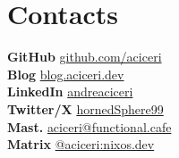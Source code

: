 \documentclass[]{cv}
\begin{document}
\begin{minipage}[t]{0.24\textwidth}
  \sectionsep

  \section{Contacts}
  {\bf GitHub} \textrm{\href{https://github.com/}{github.com/aciceri}} \\
  {\bf Blog} \href{https://blog.aciceri.dev}{blog.aciceri.dev} \\
  {\bf LinkedIn} \href{https://www.linkedin.com/}{andreaciceri} \\
  {\bf Twitter/X} \href{https://x.com/hornedSphere99}{hornedSphere99} \\
  {\bf Mast.}
  \href{https://functional.cafe/@aciceri}{aciceri@functional.cafe} \\
  {\bf Matrix} \href{https://matrix.to/#/@aciceri:nixos.dev}{@aciceri:nixos.dev}
  \sectionsep

\end{minipage}
\end{document}
